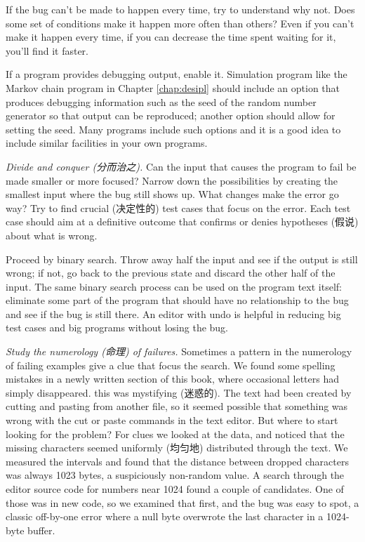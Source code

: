 If the bug can't be made to happen every time, try to understand why not.
Does some set of conditions make it happen more often than others? Even if
you can't make it happen every time, if you can decrease the time spent
waiting for it, you'll find it faster. 

If a program provides debugging output, enable it. Simulation program like
the Markov chain program in Chapter \ref{chap:desipl} should include an
option that produces debugging information such as the seed of the random
number generator so that output can be reproduced; another option should
allow for setting the seed. Many programs include such options and it is a
good idea to include similar facilities in your own programs.

\emph{Divide and conquer (分而治之).} Can the input that causes the program
to fail be made smaller or more focused? Narrow down the possibilities by
creating the smallest input where the bug still shows up. What changes make
the error go way? Try to find crucial (决定性的) test cases that focus on
the error. Each test case should aim at a definitive outcome that confirms
or denies hypotheses (假说) about what is wrong.

Proceed by binary search. Throw away half the input and see if the output
is still wrong; if not, go back to the previous state and discard the other
half of the input. The same binary search process can be used on the program
text itself: eliminate some part of the program that should have no
relationship to the bug and see if the bug is still there. An editor with
undo is helpful in reducing big test cases and big programs without losing
the bug.

\emph{Study the numerology (命理) of failures.} Sometimes a pattern in the
numerology of failing examples give a clue that focus the search. We found
some spelling mistakes in a newly written section of this book, where
occasional letters had simply disappeared. this was mystifying (迷惑的).
The text had been created by cutting and pasting from another file, so it
seemed possible that something was wrong with the cut or paste commands in
the text editor. But where to start looking for the problem? For clues we
looked at the data, and noticed that the missing characters seemed
uniformly (均匀地) distributed through the text. We measured the intervals
and found that the distance between dropped characters was always 1023
bytes, a suspiciously non-random value. A search through the editor source
code for numbers near 1024 found a couple of candidates. One of those was
in new code, so we examined that first, and the bug was easy to spot, a
classic off-by-one error where a null byte overwrote the last character in
a 1024-byte buffer.

